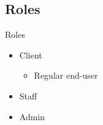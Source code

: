 \subsection{Roles}
\begin{frame}{Roles}

\begin{itemize}
\item Client
	\begin{itemize}
	\item Regular end-user
	\end{itemize}
\item Staff
\item Admin
\end{itemize}

\end{frame}